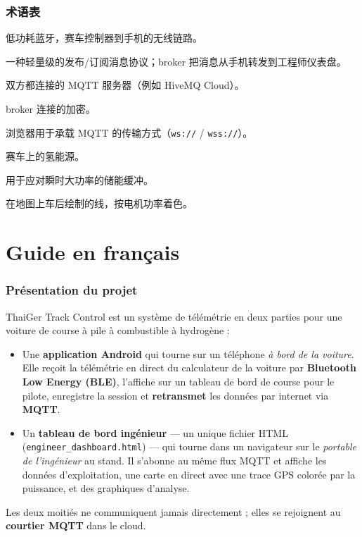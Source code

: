 \documentclass[11pt,a4paper,oneside]{report}
\newcommand{\code}[1]{\texttt{#1}}
\newcommand{\guidepart}[1]{%
  \clearpage
  \part*{#1}%
  \addcontentsline{toc}{part}{#1}%
  \setcounter{section}{0}%
}
\begin{document}
\section{术语表}
\begin{description}[style=nextline,leftmargin=0pt,labelwidth=0pt,labelsep=0pt,itemindent=0pt]
  \item[BLE] 低功耗蓝牙，赛车控制器到手机的无线链路。
  \item[MQTT] 一种轻量级的发布/订阅消息协议；broker 把消息从手机转发到工程师仪表盘。
  \item[Broker（代理服务器）] 双方都连接的 MQTT 服务器（例如 HiveMQ Cloud）。
  \item[TLS] broker 连接的加密。
  \item[WebSocket] 浏览器用于承载 MQTT 的传输方式（\code{ws://} / \code{wss://}）。
  \item[燃料电池（FC）] 赛车上的氢能源。
  \item[超级电容（Supercap）] 用于应对瞬时大功率的储能缓冲。
  \item[轨迹（Trail）] 在地图上车后绘制的线，按电机功率着色。
\end{description}


\guidepart{Guide en français}

\section{Présentation du projet}
ThaiGer Track Control est un système de télémétrie en deux parties pour une
voiture de course à pile à combustible à hydrogène :
\begin{itemize}
  \item Une \textbf{application Android} qui tourne sur un téléphone \emph{à bord
    de la voiture}. Elle reçoit la télémétrie en direct du calculateur de la
    voiture par \textbf{Bluetooth Low Energy (BLE)}, l'affiche sur un tableau de
    bord de course pour le pilote, enregistre la session et \textbf{retransmet} les
    données par internet via \textbf{MQTT}.
  \item Un \textbf{tableau de bord ingénieur} --- un unique fichier HTML
    (\code{engineer\_dashboard.html}) --- qui tourne dans un navigateur sur le
    \emph{portable de l'ingénieur} au stand. Il s'abonne au même flux MQTT et
    affiche les données d'exploitation, une carte en direct avec une trace GPS
    colorée par la puissance, et des graphiques d'analyse.
\end{itemize}
Les deux moitiés ne communiquent jamais directement ; elles se rejoignent au
\textbf{courtier MQTT} dans le cloud.
\end{document}
